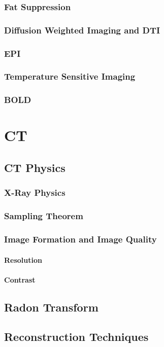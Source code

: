 \documentclass{book}
\begin{document}
				\section{Fat Suppression}
				\section{Diffusion Weighted Imaging and DTI}
				\section{EPI}
				\section{Temperature Sensitive Imaging}
				\section{BOLD}
		
		\part{CT}
			\chapter{CT Physics}
				\section{X-Ray Physics}
				\section{Sampling Theorem}
				\section{Image Formation and Image Quality}
					\subsection{Resolution}
					\subsection{Contrast}
			\chapter{Radon Transform}
			\chapter{Reconstruction Techniques}
\end{document}
